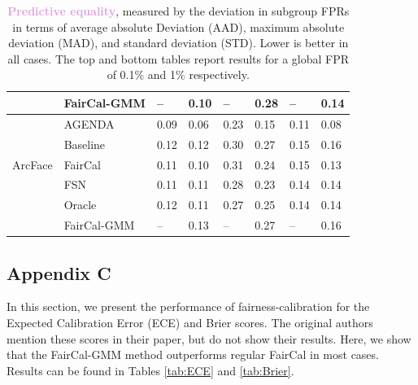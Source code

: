 \begin{table}
\begin{tabular}{l l ll ll ll}
& FairCal-GMM &     -- &  0.10  &     -- &  0.28  &     -- &  0.14  \\
\hline
\multirow{5}{5em}{ArcFace} 
& AGENDA      &    0.09 &  0.06  &    0.23 &  0.15  &    0.11 &  0.08  \\
& Baseline    &    0.12 &  0.12  &    0.30 &  0.27  &    0.15 &  0.16  \\
& FairCal     &    0.11 &  0.10  &    0.31 &  0.24  &    0.15 &  0.13  \\
& FSN         &    0.11 &  0.11  &    0.28 &  0.23  &    0.14 &  0.14  \\
& Oracle      &    0.12 &  0.11  &    0.27 &  0.25  &    0.14 &  0.14  \\
& FairCal-GMM &     -- &  0.13  &     -- &  0.27  &     -- &  0.16  \\
\bottomrule
\end{tabular}
\caption{\textcolor{Plum}{\textbf{Predictive equality}}, measured by the deviation in subgroup FPRs in terms of average absolute Deviation (AAD), maximum absolute deviation (MAD), and standard deviation (STD). Lower is better in all cases. The top and bottom tables report results for a global FPR of 0.1\% and 1\% respectively.}
\label{tab:appPredEq}
\end{table}

\subsection{Appendix C}
In this section, we present the performance of fairness-calibration for the Expected Calibration Error (ECE) \citep{ECEscore} and Brier \citep{BrierSource} scores. The original authors mention these scores in their paper, but do not show their results. Here, we show that the FairCal-GMM method outperforms regular FairCal in most cases. Results can be found in Tables \ref{tab:ECE} and \ref{tab:Brier}.

